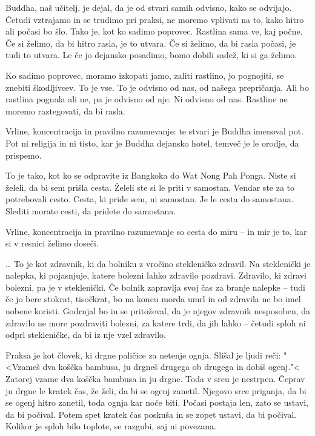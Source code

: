 \vspace{-2\baselineskip}

Buddha, naš učitelj, je dejal, da je od stvari samih odvisno, kako se odvijajo. Četudi vztrajamo in se trudimo pri praksi, ne moremo vplivati na to, kako hitro ali počasi bo šlo. Tako je, kot ko sadimo poprovec. Rastlina sama ve, kaj počne. Če si želimo, da bi hitro rasla, je to utvara. Če si želimo, da bi rasla počasi, je tudi to utvara. Le če jo dejansko posadimo, bomo dobili sadež, ki si ga želimo.

Ko sadimo poprovec, moramo izkopati jamo, zaliti rastlino, jo pognojiti, se znebiti škodljivcev. To je vse. To je odvisno od nas, od našega prepričanja. Ali bo rastlina pognala ali ne, pa je odvisno od nje. Ni odvisno od nas. Rastline ne moremo raztegovati, da bi rasla.

\clearpage


Vrline, koncentracija in pravilno razumevanje: te stvari je Buddha imenoval pot. Pot ni religija in ni tisto, kar je Buddha dejansko hotel, temveč je le orodje, da prispemo.

To je tako, kot ko se odpravite iz Bangkoka do Wat Nong Pah Ponga. Niste si želeli, da bi sem prišla cesta. Želeli ste si le priti v samostan. Vendar ste za to potrebovali cesto. Cesta, ki pride sem, ni samostan. Je le cesta do samostana. Slediti morate cesti, da pridete do samostana.

Vrline, koncentracija in pravilno razumevanje so cesta do miru – in mir je to, kar si v resnici želimo doseči.

\vspace{-\baselineskip}

\ldots{} To je kot zdravnik, ki da bolniku z vročino stekleničko zdravil. Na steklenički je nalepka, ki pojasnjuje, katere bolezni lahko zdravilo pozdravi. Zdravilo, ki zdravi bolezni, pa je v steklenički. Če bolnik zapravlja svoj čas za branje nalepke – tudi če jo bere stokrat, tisočkrat, bo na koncu morda umrl in od zdravila ne bo imel nobene koristi. Godrnjal bo in se pritoževal, da je njegov zdravnik nesposoben, da zdravilo ne more pozdraviti bolezni, za katere trdi, da jih lahko – četudi sploh ni odprl stekleničke, da bi iz nje vzel zdravilo.

\clearpage


Praksa je kot človek, ki drgne paličice za netenje ognja. Slišal je ljudi reči: "<Vzameš dva koščka bambusa, ju drgneš drugega ob drugega in dobiš ogenj."< Zatorej vzame dva koščka bambusa in ju drgne. Toda v srcu je nestrpen. Čeprav ju drgne le kratek čas, že želi, da bi se ogenj zanetil. Njegovo srce priganja, da bi se ogenj hitro zanetil, toda ognja kar noče biti. Počasi postaja len, zato se ustavi, da bi počival. Potem spet kratek čas poskuša in se zopet ustavi, da bi počival. Kolikor je sploh bilo toplote, se razgubi, saj ni povezana.


